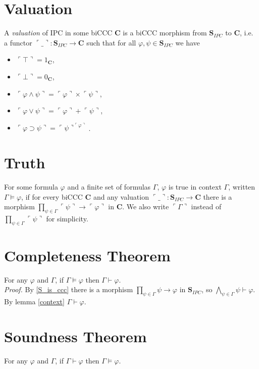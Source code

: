 \documentclass[a4paper,12pt]{paper}
\newcommand{\val}[1]{\ulcorner #1 \urcorner}
\begin{document}
\section{Valuation}
A \emph{valuation} of IPC in some biCCC $\mathbf{C}$ is a biCCC morphism from $\mathbf{S}_{IPC}$ to $\mathbf{C}$, i.e. a functor $\val \_  :‌\mathbf{S}_{IPC} \longrightarrow \mathbf{C}$ such that for all $\varphi, \psi \in \mathbf{S}_{IPC}$ we have\\
\begin{itemize}
	\item $\val \top  = 1_{\mathbf{C}}$,\\
	\item $\val \bot  = 0_{\mathbf{C}}$,\\
	\item $\val{\varphi \land \psi}  = \val \varphi  \times \val \psi $,\\
	\item $\val{\varphi \lor \psi}  = \val \varphi  + \val \psi $,\\
	\item $\val{\varphi \supset \psi}  = \val \psi ^{\val \varphi }$.
\end{itemize}

\section{Truth}
For some formula $\varphi$ and a finite set of formulas $\Gamma$, $\varphi$ is true in context $\Gamma$, written $\Gamma \models \varphi$, if for every biCCC $\mathbf{C}$ and any valuation $\val \_  :‌\mathbf{S}_{IPC} \longrightarrow \mathbf{C}$ there is a morphism $\prod_{\psi \in \Gamma} \val \psi  \longrightarrow \val \varphi $ in $\mathbf{C}$. We also write $\val \Gamma $ instead of $\prod_{\psi \in \Gamma}  \val \psi $ for simplicity.

\section{Completeness Theorem} For any $\varphi$ and $\Gamma$, if $\Gamma \models \varphi$ then $\Gamma \vdash \varphi$. \\
\emph{Proof.} By \ref{S_is_ccc} there is a morphism $\prod_{\psi \in \Gamma} \psi \longrightarrow \varphi$ in $\mathbf{S}_{IPC}$, so $\bigwedge_{\psi \in \Gamma} \psi \vdash \varphi$. By lemma \ref{context} $\Gamma \vdash \varphi$.

\section{Soundness Theorem} For any $\varphi$ and $\Gamma$, if $\Gamma \vdash \varphi$ then $\Gamma \models \varphi$.
\end{document}
